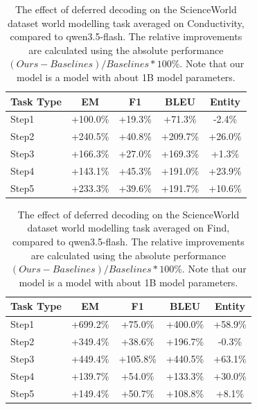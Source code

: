 \begin{table}[h]
\centering
    \setlength\tabcolsep{15pt}
    \setlength\extrarowheight{0pt}
\caption{The effect of deferred decoding on the ScienceWorld dataset \citep{wang-etal-2022-scienceworld} world modelling task averaged on Conductivity, compared to qwen3.5-flash. The relative improvements are calculated using the absolute performance $(Ours - Baselines) / Baselines * 100\%$. Note that our model is a model with about 1B model parameters.}
\label{tab:scienceworld15}
\begin{tabular}{lcccc}
\toprule
\textbf{Task Type} & \textbf{EM} & \textbf{F1}
  & \textbf{BLEU} & \textbf{Entity}\\
\midrule
Step1 & +100.0\% & +19.3\% & +71.3\% & -2.4\% \\
Step2 & +240.5\% & +40.8\% & +209.7\% & +26.0\% \\
Step3 & +166.3\% & +27.0\% & +169.3\% & +1.3\% \\
Step4 & +143.1\% & +45.3\% & +191.0\% & +23.9\% \\
Step5 & +233.3\% & +39.6\% & +191.7\% & +10.6\% \\

\bottomrule
\end{tabular}
\end{table}


\begin{table}[h]
\centering
    \setlength\tabcolsep{15pt}
    \setlength\extrarowheight{0pt}
\caption{The effect of deferred decoding on the ScienceWorld dataset \citep{wang-etal-2022-scienceworld} world modelling task averaged on Find, compared to qwen3.5-flash. The relative improvements are calculated using the absolute performance $(Ours - Baselines) / Baselines * 100\%$. Note that our model is a model with about 1B model parameters.}
\label{tab:scienceworld16}
\begin{tabular}{lcccc}
\toprule
\textbf{Task Type} & \textbf{EM} & \textbf{F1}
  & \textbf{BLEU} & \textbf{Entity}\\
\midrule
Step1 & +699.2\% & +75.0\% & +400.0\% & +58.9\% \\
Step2 & +349.4\% & +38.6\% & +196.7\% & -0.3\% \\
Step3 & +449.4\% & +105.8\% & +440.5\% & +63.1\% \\
Step4 & +139.7\% & +54.0\% & +133.3\% & +30.0\% \\
Step5 & +149.4\% & +50.7\% & +108.8\% & +8.1\% \\

\bottomrule
\end{tabular}
\end{table}


